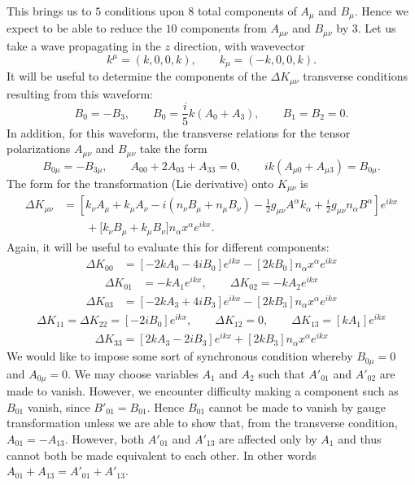 \documentclass[10pt,letterpaper]{article}
\numberwithin{equation}{subsection}
\begin{document}
This brings us to $5$ conditions upon $8$ total components of $A_\mu$ and $B_\mu$. Hence we expect to be able to reduce the $10$ components from $A_{\mu\nu}$ and $B_{\mu\nu}$ by 3.  
Let us take a wave propagating in the $z$ direction, with wavevector
\begin{equation}
k^\mu = (k,0,0,k),\qquad k_\mu = (-k,0,0,k).
\end{equation}
It will be useful to determine the components of the $\Delta K_{\mu\nu}$ transverse conditions resulting from this waveform:
\begin{equation}
B_0 = -B_3,\qquad B_0 = \frac{i}{5}k(A_0+A_3),\qquad B_1 = B_2 = 0.
\end{equation}
In addition, for this waveform, the transverse relations for the tensor polarizations $A_{\mu\nu}$ and $B_{\mu\nu}$ take the form
\begin{equation}
B_{0\mu} = -B_{3\mu},\qquad A_{00}+2A_{03}+A_{33} = 0,\qquad ik(A_{\mu 0}+ A_{\mu 3}) = B_{0\mu}.
\end{equation}
The form for the transformation (Lie derivative) onto $K_{\mu\nu}$ is
\begin{align}
\Delta K_{\mu\nu} &= \left[ k_\nu A_\mu + k_\mu A_\nu - i \left( n_\nu B_\mu + n_\mu B_\nu\right) 
-\frac12 g_{\mu\nu} A^\alpha k_\alpha + \frac{i}{2} g_{\mu\nu}n_\alpha B^\alpha \right]e^{ikx}
\nonumber\\
&\qquad + \bigg[ k_\nu B_\mu + k_\mu B_\nu \bigg] n_\alpha x^\alpha e^{ikx}.
\end{align}
Again, it will be useful to evaluate this for different components:
\begin{align}
\Delta K_{00} &=\left[ -2 kA_0 -4i B_0\right]e^{ikx} - \left[2kB_0\right] n_\alpha x^\alpha e^{ikx}
\end{align}
\begin{align}
\Delta K_{01} &=  -k A_1 e^{ikx},\qquad \Delta K_{02} =  -k A_2 e^{ikx}
\end{align}
\begin{align}
\Delta K_{03} &= \left[ -2 kA_3 +4i B_3\right]e^{ikx} - \left[2kB_3\right] n_\alpha x^\alpha e^{ikx}
\end{align}
\begin{align}
\Delta K_{11} = \Delta K_{22} =  [-2iB_0] e^{ikx},\qquad \Delta K_{12} = 0,\qquad \Delta K_{13} = [kA_1]e^{ikx}
\end{align}
\begin{align}
\Delta K_{33} = \left[ 2kA_3 - 2iB_3\right]e^{ikx} + [2kB_3]n_\alpha x^\alpha e^{ikx}
\end{align}
We would like to impose some sort of synchronous condition whereby $B_{0\mu} = 0$ and $A_{0\mu} = 0$. We may choose variables $A_1$ and $A_2$ such that $A'_{01}$ and $A'_{02}$ are made to vanish. However, we encounter difficulty making a component such as $B_{01}$ vanish, since $B'_{01} = B_{01}$. Hence $B_{01}$ cannot be made to vanish by gauge transformation unless we are able to show that, from the transverse condition, $A_{01} = -A_{13}$. However, both $A'_{01}$ and $A'_{13}$ are affected only by $A_1$ and thus cannot both be made equivalent to each other. In other words $A_{01} + A_{13} = A'_{01} + A'_{13}$. 
\end{document}
